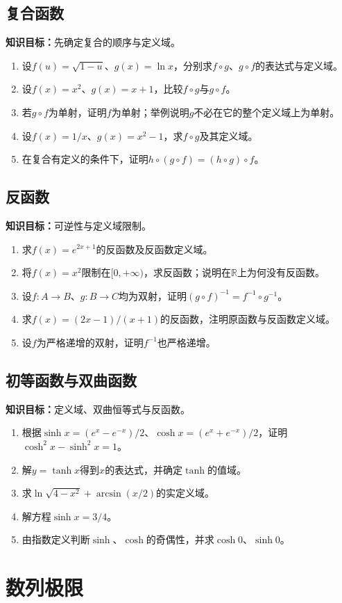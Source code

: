\documentclass[11pt,a4paper,fontset=fandol]{ctexrep}
\newcommand{\goal}[1]{\textbf{知识目标：}#1\par}
\begin{document}
\subsection{复合函数}
\goal{先确定复合的顺序与定义域。}
\begin{enumerate}
\item 设$f(u)=\sqrt{1-u}$、$g(x)=\ln x$，分别求$f\circ g$、$g\circ f$的表达式与定义域。
\item 设$f(x)=x^2$、$g(x)=x+1$，比较$f\circ g$与$g\circ f$。
\item 若$g\circ f$为单射，证明$f$为单射；举例说明$g$不必在它的整个定义域上为单射。
\item 设$f(x)=1/x$、$g(x)=x^2-1$，求$f\circ g$及其定义域。
\item 在复合有定义的条件下，证明$h\circ(g\circ f)=(h\circ g)\circ f$。
\end{enumerate}
\subsection{反函数}
\goal{可逆性与定义域限制。}
\begin{enumerate}
\item 求$f(x)=e^{2x+1}$的反函数及反函数定义域。
\item 将$f(x)=x^2$限制在$[0,+\infty)$，求反函数；说明在$\mathbb R$上为何没有反函数。
\item 设$f:A\to B$、$g:B\to C$均为双射，证明$(g\circ f)^{-1}=f^{-1}\circ g^{-1}$。
\item 求$f(x)=(2x-1)/(x+1)$的反函数，注明原函数与反函数定义域。
\item 设$f$为严格递增的双射，证明$f^{-1}$也严格递增。
\end{enumerate}
\subsection{初等函数与双曲函数}
\goal{定义域、双曲恒等式与反函数。}
\begin{enumerate}
\item 根据$\sinh x=(e^x-e^{-x})/2$、$\cosh x=(e^x+e^{-x})/2$，证明$\cosh^2x-\sinh^2x=1$。
\item 解$y=\tanh x$得到$x$的表达式，并确定$\tanh$的值域。
\item 求$\ln\sqrt{4-x^2}+\arcsin(x/2)$的实定义域。
\item 解方程$\sinh x=3/4$。
\item 由指数定义判断$\sinh$、$\cosh$的奇偶性，并求$\cosh0$、$\sinh0$。
\end{enumerate}
\section{数列极限}
\end{document}
